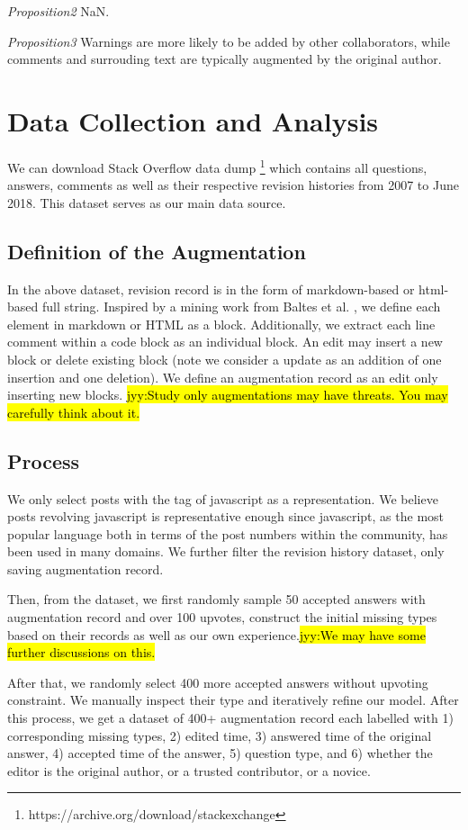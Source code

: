 \documentclass[10pt,conference]{IEEEtran}
\newcommand{\jyy}[1]{\sethlcolor{yellow}\hl{jyy:#1}\xspace}
\begin{document}
{\em Proposition2}
NaN.

{\em Proposition3}
Warnings are more likely to be added by other collaborators, while comments and surrouding text are typically augmented by the original author. 



\section {Data Collection and Analysis}
We can download Stack Overflow data dump \footnote{https://archive.org/download/stackexchange} which contains all questions, answers, comments as well as their respective revision histories from 2007 to June 2018. 
This dataset serves as our main data source.

\subsection {Definition of the Augmentation}
In the above dataset, revision record is in the form of markdown-based or html-based full string. 
Inspired by a mining work from Baltes et al. \cite{DBLP:journals/corr/abs-1803-07311}, we define each element in markdown or HTML as a block. 
Additionally, we extract each line comment within a code block as an individual block. 
An edit may insert a new block or delete existing block (note we consider a update as an addition of one insertion and one deletion). 
We define an augmentation record as an edit only inserting new blocks. 
\jyy{Study only augmentations may have threats. You may carefully think about it.}


\subsection {Process}
We only select posts with the tag of javascript as a representation. 
We believe posts revolving javascript is representative enough since javascript, as the most popular language both in terms of the post numbers within the community, has been used in many domains. 
We further filter the revision history dataset, only saving augmentation record.

Then, from the dataset, we first randomly sample 50 accepted answers with augmentation record and over 100 upvotes, construct the initial missing types based on their records as well as our own experience.\jyy{We may have some further discussions on this.}

After that, we randomly select 400 more accepted answers without upvoting constraint. 
We manually inspect their type and iteratively refine our model. 
After this process, we get a dataset of 400+ augmentation record each labelled with 1) corresponding missing types, 2) edited time, 3) answered time of the original answer, 4) accepted time of the answer, 5) question type, and 6) whether the editor is the original author, or a trusted contributor, or a novice.
\end{document}
